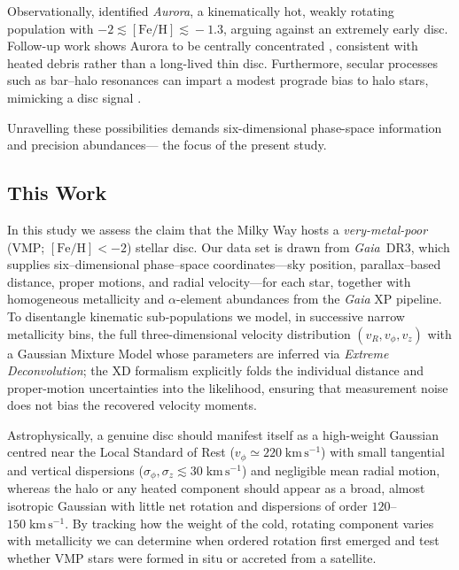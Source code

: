 \documentclass[a4paper,12pt]{article}
\begin{document}
Observationally, \citet{Belokurov2022} identified \textit{Aurora}, a kinematically hot, weakly rotating  
population with $-2\!\lesssim\![\mathrm{Fe/H}]\!\lesssim\!-1.3$, arguing against an extremely early disc.  
Follow-up work shows Aurora to be centrally concentrated \citep{Rix2022,Arentsen2020,Arentsen2020a}, 
consistent with heated debris rather than a long-lived thin disc.  
Furthermore, secular processes such as bar–halo resonances can impart a modest prograde bias to halo stars, 
mimicking a disc signal \citep{Dillamore2023}.  

Unravelling these possibilities demands six-dimensional phase-space information and precision abundances— 
the focus of the present study.

\subsection{This Work}

In this study we assess the claim that the Milky Way hosts a \emph{very-metal-poor} 
(VMP; $[\mathrm{Fe/H}]<-2$) stellar disc.  Our data set is drawn from \textit{Gaia}~DR3, 
which supplies six–dimensional phase–space coordinates—sky position, parallax–based distance, 
proper motions, and radial velocity—for each star, together with homogeneous metallicity and 
$\alpha$-element abundances from the \textit{Gaia} XP pipeline.  To disentangle kinematic 
sub-populations we model, in successive narrow metallicity bins, the full three-dimensional 
velocity distribution $(v_R,v_\phi,v_z)$ with a Gaussian Mixture Model whose parameters are inferred 
via \emph{Extreme Deconvolution}; the XD formalism explicitly folds the individual distance and 
proper-motion uncertainties into the likelihood, ensuring that measurement noise does not bias 
the recovered velocity moments.

Astrophysically, a genuine disc should manifest itself as a high-weight Gaussian centred near the Local 
Standard of Rest ($v_\phi\simeq220\;\mathrm{km\,s^{-1}}$) with small tangential and vertical dispersions 
($\sigma_\phi,\sigma_z\lesssim30\;\mathrm{km\,s^{-1}}$) and negligible mean radial motion, whereas the 
halo or any heated component should appear as a broad, almost isotropic Gaussian with little net rotation 
and dispersions of order $120$–$150\;\mathrm{km\,s^{-1}}$.  By tracking how the weight of the cold, 
rotating component varies with metallicity we can determine when ordered rotation first emerged and 
test whether VMP stars were formed in situ or accreted from a satellite.
\end{document}
